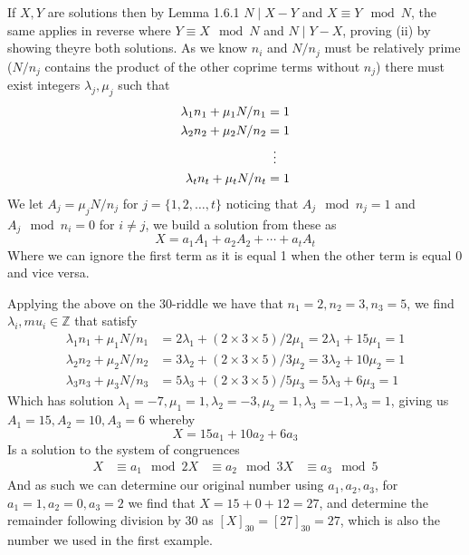 \begin{prf}
    If $X,Y$ are solutions then by Lemma 1.6.1 $N\mid X-Y$ and $X\equiv Y\mod N$, the same applies in reverse where $Y\equiv X\mod N$ and $N\mid Y-X$, proving (ii) by showing theyre both solutions. As we know $n_{i}$ and $N/n_{j}$ must be relatively prime ($N/n_{j}$ contains the product of the other coprime terms without $n_{j}$) there must exist integers $\lambda_{j},\mu_{j}$ such that
    \begin{align*}
        \lambda_{1} n_{1}+\mu_{1}N/n_{1}&=1 \\
        \lambda_{2}n_{2}+\mu_{2}N/n_{2}&=1 \\
                                       &\vdotswithin{\equiv} \\
        \lambda_{t}n_{t}+\mu_{t}N/n_{t}&=1
    \end{align*}
    We let $A_{j}=\mu_{j}N/n_{j}$ for $j=\{1,2,\ldots,t\}$ noticing that $A_{j}\mod n_{j}=1$ and $A_{j}\mod n_{i}=0$ for $i\neq j$, we build a solution from these as
    \[
        X=a_{1}A_{1}+a_{2}A_{2}+\cdots+a_{t}A_{t}
    \]
    Where we can ignore the first term as it is equal 1 when the other term is equal 0 and vice versa.
\end{prf}
\begin{exmp}
    Applying the above on the 30-riddle we have that $n_{1}=2,n_{2}=3,n_{3}=5$, we find $\lambda_{i},mu_{i}\in\mathbb{Z}$ that satisfy
    \begin{align*}
        \lambda_{1}n_{1}+\mu_{1}N/n_{1}&=2\lambda_{1}+(2\times 3\times 5)/2\mu_{1}=2\lambda_{1}+15\mu_{1}=1 \\
        \lambda_{2}n_{2}+\mu_{2}N/n_{2}&=3\lambda_{2}+(2\times 3\times 5)/3\mu_{2}=3\lambda_{2}+10\mu_{2}=1 \\
        \lambda_{3}n_{3}+\mu_{3}N/n_{3}&=5\lambda_{3}+(2\times 3\times 5)/5\mu_{3}=5\lambda_{3}+6\mu_{3}=1
    \end{align*}
    Which has solution $\lambda_{1}=-7,\mu_{1}=1,\lambda_{2}=-3,\mu_{2}=1,\lambda_{3}=-1,\lambda_{3}=1$, giving us $A_{1}=15,A_{2}=10,A_{3}=6$ whereby
    \[
        X=15a_{1}+10a_{2}+6a_{3}
    \]
    Is a solution to the system of congruences
    \begin{align*}
        X&\equiv a_{1}\mod 2
        X&\equiv a_{2}\mod 3
        X&\equiv a_{3}\mod 5
    \end{align*}
    And as such we can determine our original number using $a_{1},a_{2},a_{3}$, for $a_{1}=1,a_{2}=0,a_{3}=2$ we find that $X=15+0+12=27$, and determine the remainder following division by 30 as $[X]_{30}=[27]_{30}=27$, which is also the number we used in the first example.
\end{exmp}
